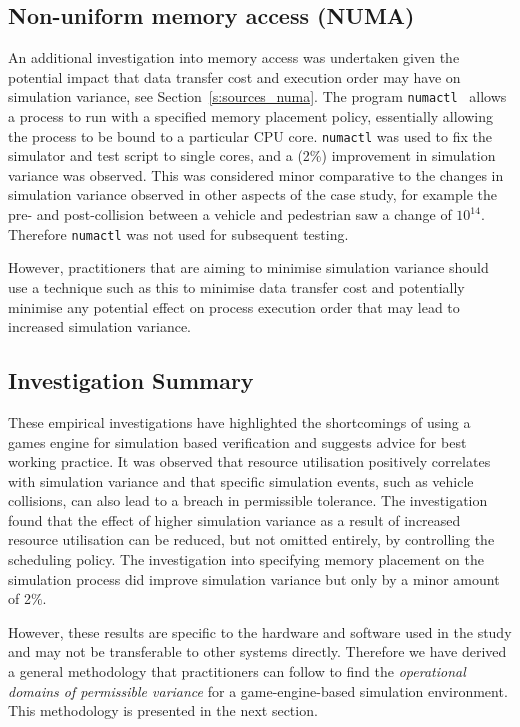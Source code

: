 \DIFaddend \subsection{Non-uniform memory access (NUMA)} \label{r:numa}
An additional investigation into memory access was undertaken given the potential impact that data transfer cost and execution order may have on simulation variance, see Section~\ref{s:sources_numa}. %
The program \texttt{numactl}~\cite{numactl_NUMA} allows a process to run with a specified memory placement policy, essentially allowing the process to be bound to a particular CPU core. %
\texttt{numactl} was used to fix the simulator and test script to single cores, and a (2\%) improvement in simulation variance was observed. %
This was considered minor comparative to the changes in simulation variance observed in other aspects of the case study, for example the pre- and post-collision between a vehicle and pedestrian saw a change of $10^{14}$. Therefore \texttt{numactl} was not used for subsequent testing.

However, practitioners that are aiming to minimise simulation variance should use a technique such as this to minimise data transfer cost and potentially minimise any potential effect on process execution order that may lead to increased simulation variance. 


\DIFaddbegin 

\DIFaddend \subsection{Investigation Summary} \label{s:empirical_summary} 
These empirical investigations have highlighted the shortcomings of using a games engine for simulation based verification and suggests advice for best working practice. It was observed that resource utilisation positively correlates with simulation variance and that specific simulation events, such as vehicle collisions, can also lead to a breach in permissible tolerance. The investigation found that the effect of higher simulation variance as a result of increased resource utilisation can be reduced, but not omitted entirely, by controlling the scheduling policy. The investigation into specifying memory placement on the simulation process did improve simulation variance but only by a minor amount of 2\%.

However, these results are specific to the hardware and software used in the study and may not be transferable to other systems directly. Therefore we have derived a general methodology that practitioners can follow to find the \textit{operational domains of permissible variance} for a game-engine-based simulation environment. This methodology is presented in the next section. 


